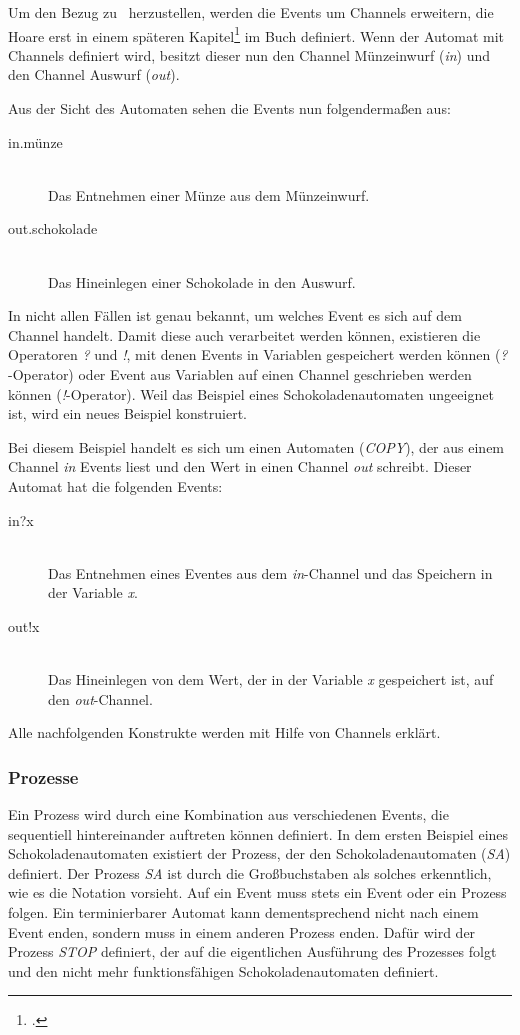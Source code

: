 Um den Bezug zu \CA\ herzustellen, werden die Events um Channels erweitern, die Hoare erst in einem späteren Kapitel\footcite[Kap. 4.2]{CSPBOOK} im Buch definiert.
Wenn der Automat mit Channels definiert wird, besitzt dieser nun den Channel Münzeinwurf (\textit{in}) und den Channel Auswurf (\textit{out}).

Aus der Sicht des Automaten sehen die Events nun folgendermaßen aus:

\begin{description}
\item[in.münze]\hfill \\
Das Entnehmen einer Münze aus dem Münzeinwurf.
\item[out.schokolade]\hfill \\
Das Hineinlegen einer Schokolade in den Auswurf.
\end{description}

In nicht allen Fällen ist genau bekannt, um welches Event es sich auf dem Channel handelt. Damit diese auch verarbeitet werden können, existieren die Operatoren \textit{?} und \textit{!}, mit denen Events in Variablen gespeichert werden können (\textit{?}-Operator) oder Event aus Variablen auf einen Channel geschrieben werden können (\textit{!}-Operator). Weil das Beispiel eines Schokoladenautomaten ungeeignet ist, wird ein neues Beispiel konstruiert. 

Bei diesem Beispiel handelt es sich um einen Automaten (\textit{COPY}), der aus einem Channel \textit{in} Events liest und den Wert in einen Channel \textit{out} schreibt. Dieser Automat hat die folgenden Events:

\begin{description}
\item[in?x]\hfill \\
Das Entnehmen eines Eventes aus dem \textit{in}-Channel und das Speichern in der Variable \textit{x}.
\item[out!x]\hfill \\
Das Hineinlegen von dem Wert, der in der Variable \textit{x} gespeichert ist, auf den \textit{out}-Channel.
\end{description}

Alle nachfolgenden Konstrukte werden mit Hilfe von Channels erklärt.

\subsubsection{Prozesse}
Ein Prozess wird durch eine Kombination aus verschiedenen Events, die sequentiell hintereinander auftreten können definiert. In dem ersten Beispiel eines Schokoladenautomaten existiert der Prozess, der den  Schokoladenautomaten (\textit{SA}) definiert. Der Prozess \textit{SA} ist durch die Großbuchstaben als solches erkenntlich, wie es die Notation vorsieht. Auf ein Event muss stets ein Event oder ein Prozess folgen. Ein terminierbarer Automat kann dementsprechend nicht nach einem Event enden, sondern muss in einem anderen Prozess enden. Dafür wird der Prozess \textit{STOP} definiert, der auf die eigentlichen Ausführung des Prozesses folgt und den nicht mehr funktionsfähigen Schokoladenautomaten definiert.

